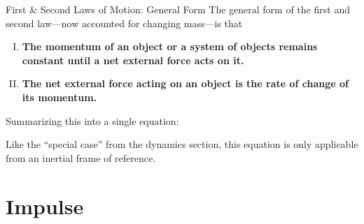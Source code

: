 \documentclass[12pt,compress,aspectratio=169]{beamer}
\begin{document}
\begin{frame}{First \& Second Laws of Motion: General Form}
  The general form of the first and second law---now accounted for changing
  mass---is that
  \begin{enumerate}[I.]
  \item\textbf{The momentum of an object or a system of objects remains
    constant until a net external force acts on it.}
  \item\textbf{The net external force acting on an object
    is the rate of change of its momentum.}
  \end{enumerate}
  Summarizing this into a single equation:


  Like the ``special case'' from the dynamics section, this equation is only
  applicable from an inertial frame of reference.
\end{frame}



%
%  
%



\section{Impulse}
\end{document}
